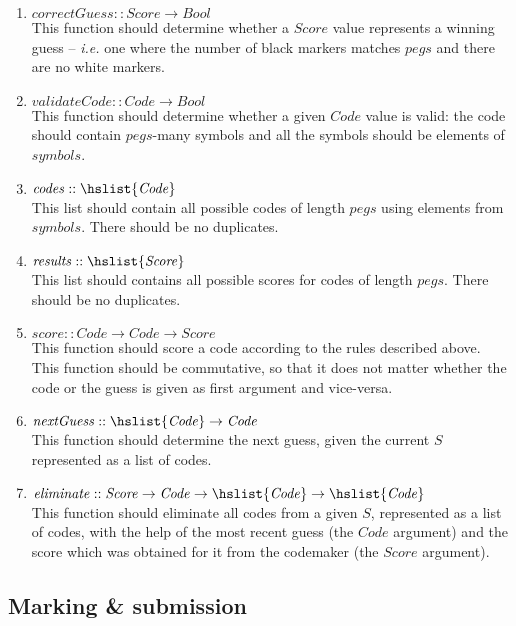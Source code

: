 \documentclass{cs256-shared/cs256}
\begin{document}
\begin{enumerate}
	\item $\mathit{correctGuess} :: \mathit{Score} \to \mathit{Bool}$\\
	This function should determine whether a $\mathit{Score}$ value represents a winning guess -- \emph{i.e.} one where the number of black markers matches $\mathit{pegs}$ and there are no white markers.
	\item $\mathit{validateCode} :: \mathit{Code} \to \mathit{Bool}$\\
	This function should determine whether a given $\mathit{Code}$ value is valid: the code should contain $\mathit{pegs}$-many symbols and all the symbols should be elements of $\mathit{symbols}$.
	\item $\mathit{codes} :: \hslist{\mathit{Code}}$\\
	This list should contain all possible codes of length $\mathit{pegs}$ using elements from $\mathit{symbols}$. There should be no duplicates.
	\item $\mathit{results} :: \hslist{\mathit{Score}}$\\
	This list should contains all possible scores for codes of length $\mathit{pegs}$. There should be no duplicates.
	\item $\mathit{score} :: \mathit{Code} \to \mathit{Code} \to \mathit{Score}$\\
	This function should score a code according to the rules described above. This function should be commutative, so that it does not matter whether the code or the guess is given as first argument and vice-versa.
	\item $\mathit{nextGuess} :: \hslist{\mathit{Code}} \to \mathit{Code}$ \\
	This function should determine the next guess, given the current $S$ represented as a list of codes.
	\item $\mathit{eliminate} :: \mathit{Score} \to \mathit{Code} \to \hslist{\mathit{Code}} \to \hslist{\mathit{Code}}$\\
	This function should eliminate all codes from a given $S$, represented as a list of codes, with the help of the most recent guess (the $\mathit{Code}$ argument) and the score which was obtained for it from the codemaker (the $\mathit{Score}$ argument).
\end{enumerate}


\subsection*{Marking \& submission}
\end{document}
